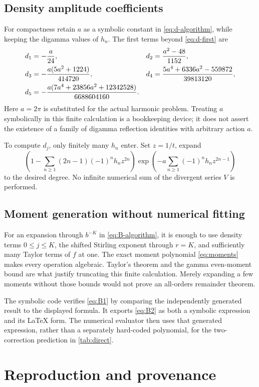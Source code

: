 \documentclass[11pt,a4paper]{article}
\theoremstyle{definition}
\numberwithin{equation}{section}
\begin{document}
\subsection{Density amplitude coefficients}
For compactness retain $a$ as a symbolic constant in \eqref{eq:d-algorithm}, while keeping the digamma values of $h_n$. The first terms beyond \eqref{eq:d-first} are
\begin{align}
 d_1&=-\frac a{24},&
 d_2&=\frac{a^2-48}{1152},\notag\\
 d_3&=-\frac{a(5a^2+1224)}{414720},&
 d_4&=\frac{5a^4+6336a^2-559872}{39813120},\notag\\
 d_5&=-\frac{a(7a^4+23856a^2+12342528)}{6688604160}.
 \label{eq:d-more}
\end{align}
Here $a=2\pi$ is substituted for the actual harmonic problem. Treating $a$ symbolically in this finite calculation is a bookkeeping device; it does not assert the existence of a family of digamma reflection identities with arbitrary action $a$.

To compute $d_j$, only finitely many $h_n$ enter. Set $z=1/t$, expand
\[
 \left(1-\sum_{n\ge1}(2n-1)(-1)^nh_nz^{2n}\right)
 \exp\left(-a\sum_{n\ge1}(-1)^nh_nz^{2n-1}\right)
\]
to the desired degree. No infinite numerical sum of the divergent series $V$ is performed.

\subsection{Moment generation without numerical fitting}
For an expansion through $b^{-K}$ in \eqref{eq:B-algorithm}, it is enough to use density terms $0\le j\le K$, the shifted Stirling exponent through $r=K$, and sufficiently many Taylor terms of $f$ at one. The exact moment polynomial \eqref{eq:moments} makes every operation algebraic. Taylor's theorem and the gamma even-moment bound are what justify truncating this finite calculation. Merely expanding a few moments without those bounds would not prove an all-orders remainder theorem.

The symbolic code verifies \eqref{eq:B1} by comparing the independently generated result to the displayed formula. It exports \eqref{eq:B2} as both a symbolic expression and its LaTeX form. The numerical evaluator then uses that generated expression, rather than a separately hard-coded polynomial, for the two-correction prediction in \cref{tab:direct}.

\section{Reproduction and provenance}
\label{app:provenance}
\end{document}
